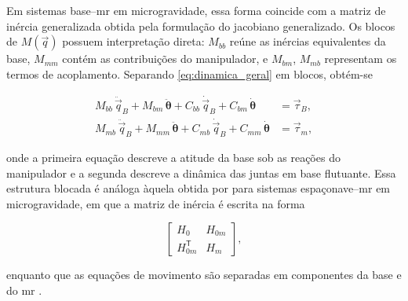 Em sistemas base--\gls{mr} em microgravidade, essa forma coincide com a matriz de inércia generalizada obtida pela formulação do jacobiano generalizado.
Os blocos de $M(\vec q)$ possuem interpretação direta: $M_{bb}$ reúne as inércias equivalentes da base, $M_{mm}$ contém as contribuições do manipulador, e $M_{bm}$, $M_{mb}$ representam os termos de acoplamento.
Separando \eqref{eq:dinamica_geral} em blocos, obtém-se

\begin{align}
M_{bb}\,\ddot{\vec q}_B
+ M_{bm}\,\ddot{\boldsymbol\theta}
+ C_{bb}\,\dot{\vec q}_B
+ C_{bm}\,\dot{\boldsymbol\theta}
&=
\vec\tau_B,
\\[4pt]
M_{mb}\,\ddot{\vec q}_B
+ M_{mm}\,\ddot{\boldsymbol\theta}
+ C_{mb}\,\dot{\vec q}_B
+ C_{mm}\,\dot{\boldsymbol\theta}
&=
\vec\tau_m,
\end{align}

onde a primeira equação descreve a atitude da base sob as reações do manipulador e a segunda descreve a dinâmica das juntas em base flutuante.
Essa estrutura blocada é análoga àquela obtida por \citeauthor{Wilde2018} para sistemas espaçonave--\gls{mr} em microgravidade, em que a matriz de inércia é escrita na forma

\begin{equation}
\begin{bmatrix}
H_0 & H_{0m}\\
H_{0m}^{\mathsf T} & H_m
\end{bmatrix},
\end{equation}

enquanto que as equações de movimento são separadas em componentes da base e do \gls{mr} \cite[Eq.~(39)]{Wilde2018}.

